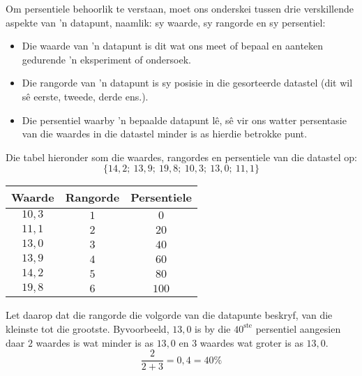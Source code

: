 Om persentiele behoorlik te verstaan, moet ons onderskei tussen drie verskillende aspekte van ’n datapunt, naamlik: sy waarde, sy rangorde en sy persentiel:
\begin{itemize}
 \item Die waarde van ’n datapunt is dit wat ons meet of bepaal en aanteken gedurende ’n eksperiment of ondersoek.
\item Die rangorde van ’n datapunt is sy posisie in die gesorteerde datastel (dit wil sê eerste, tweede, derde ens.).  
\item Die persentiel waarby ’n bepaalde datapunt lê, sê vir ons watter persentasie van die waardes in die datastel minder is as hierdie betrokke punt.
\end{itemize}
\par
   Die tabel hieronder som die waardes, rangordes en persentiele van die datastel op:
  \begin{equation*}
    \{14,2;\ 13,9;\ 19,8;\ 10,3;\ 13,0;\ 11,1\}
  \end{equation*}

  \begin{center}
    \begin{tabular}{|c|c|c|} \hline

      \textbf{Waarde} & \textbf{Rangorde} & \textbf{Persentiele} \\\hline

      $10,3$  & $1$    & $0$ \\\hline
      $11,1$  & $2$    & $20$ \\\hline
      $13,0$  & $3$    & $40$ \\\hline
      $13,9$  & $4$    & $60$ \\\hline
      $14,2$  & $5$    & $80$ \\\hline
      $19,8$  & $6$    & $100$ \\\hline

    \end{tabular}
  \end{center}

 Let daarop dat die rangorde die volgorde van die datapunte beskryf, van die kleinste tot die grootste. Byvoorbeeld, $13,0$ is by die $40^{\mathrm{ste}}$ persentiel aangesien daar $2$ waardes is wat minder is as $13,0$ en $3$ waardes wat groter is as $13,0$. 
  \begin{equation*}
    \frac{2}{2+3} = 0,4 = 40\%
  \end{equation*}

